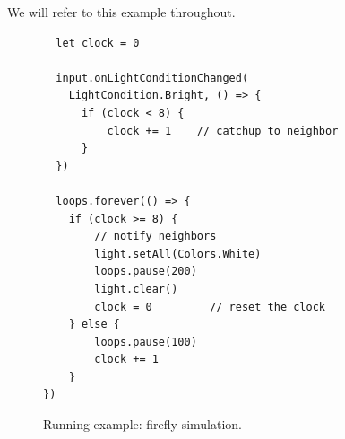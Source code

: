 We will refer to this example throughout.

\begin{figure}
\begin{lstlisting}
  let clock = 0

  input.onLightConditionChanged(
    LightCondition.Bright, () => {
      if (clock < 8) {
          clock += 1    // catchup to neighbor
      }
  })

  loops.forever(() => {
    if (clock >= 8) {
        // notify neighbors
        light.setAll(Colors.White)
        loops.pause(200)
        light.clear()
        clock = 0         // reset the clock
    } else {
        loops.pause(100)
        clock += 1
    }
})
\end{lstlisting}
\caption{\label{fig:example}Running example: firefly simulation.}
\end{figure}
